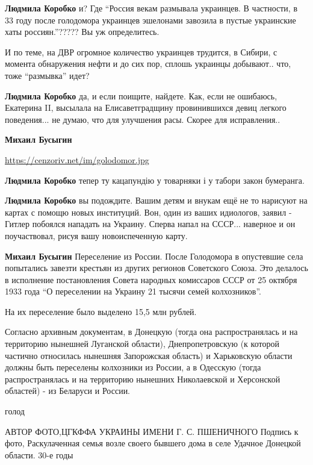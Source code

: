 \begin{itemize}
{\begin{itemize}
\textbf{Людмила Коробко} 
и? Где \enquote{Россия векам размывала украинцев. В частности, в 33 году после
голодомора украинцев эшелонами завозила в пустые украинские хаты россиян.}?????
Вы уж определитесь.

И по теме, на ДВР огромное количество украинцев трудится, в Сибири, с момента
обнаружения нефти и до сих пор, сплошь украинцы добывают.. что, тоже
\enquote{размывка} идет?


\textbf{Людмила Коробко} да, и если поищите, найдете. Как, если не ошибаюсь,
Екатерина II, высылала на Елисаветградщину провинившихся девиц легкого
поведения... не думаю, что для улучшения расы. Скорее для исправления..

\textbf{Михаил Бусыгин} 

\url{https://cenzoriv.net/im/golodomor.jpg}

\textbf{Людмила Коробко} тепер ту кацапундію у товарняки і у табори закон
бумеранга.

\textbf{Людмила Коробко} вы подождите. Вашим детям и внукам ещё не то нарисуют
на картах с помощю новых институций. Вон, один из ваших идиологов, заявил - 
Гитлер побоялся нападать на Украину. Сперва напал на СССР... наверное и он
поучаствовал, рисуя вашу новоиспеченную карту.

\textbf{Михаил Бусыгин} Переселение из России.
После Голодомора в опустевшие села попытались завезти крестьян из других
регионов Советского Союза. Это делалось в исполнение постановления Совета
народных комиссаров СССР от 25 октября 1933 года \enquote{О переселении на Украину 21
тысячи семей колхозников}.

На их переселение было выделено 15,5 млн рублей.

Согласно архивным документам, в Донецкую (тогда она распространялась и на
территорию нынешней Луганской области), Днепропетровскую (к которой частично
относилась нынешняя Запорожская область) и Харьковскую области должны быть
переселены колхозники из России, а в Одесскую (тогда распространялась и на
территорию нынешних Николаевской и Херсонской областей) - из Беларуси и России.

голод

АВТОР ФОТО,ЦГКФФА УКРАИНЫ ИМЕНИ Г. С. ПШЕНИЧНОГО
Подпись к фото,
Раскулаченная семья возле своего бывшего дома в селе Удачное Донецкой области. 30-е годы


\end{itemize}}
\end{itemize}
